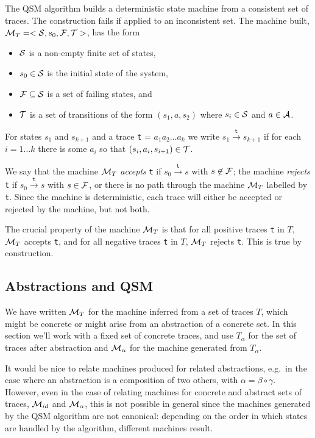 \documentclass[12pt]{article}
\begin{document}
The QSM algorithm builds a deterministic state machine from a consistent set of traces. The construction fails if applied to an inconsistent set. The  machine built, ${\cal{M}}_T = <{\cal{S}}, s_0, \cal{F}, \cal{T}>$, has the form 
\begin{itemize}
\item
$\cal{S}$ is a non-empty finite set of states,
\item
$s_0 \in \cal{S}$ is the initial state of the system,
\item
$\cal{F} \subseteq \cal{S}$ is a set of failing states, and 
\item
$\cal{T}$ is a set of transitions of the form $(s_1,a,s_2)$ where $s_i \in \cal{S}$ and $a \in \cal{A}$.
\end{itemize}
For states $s_1$ and $s_{k+1}$ and a trace \texttt{t} = $a_1{}a_2{}\ldots{}a_k$ we write $s_1 \stackrel{\texttt{t}}{\rightarrow} s_{k+1}$ if for each $i=1\ldots{}k$ there is some $a_i$ so that $(s_i,a_i,s_{i+1}) \in \cal{T}$. 

We say that the machine ${\cal{M}}_T$ \emph{accepts} \texttt{t} if $s_0 \stackrel{\texttt{t}}{\rightarrow} s$ with $s \not \in \cal{F}$; the machine \emph{rejects} \texttt{t} if $s_0 \stackrel{\texttt{t}}{\rightarrow} s$ with $s \in \cal{F}$, or there is no path through the machine ${\cal{M}}_T$ labelled by \texttt{t}. Since the machine is deterministic, each trace will either be accepted or rejected by the machine, but not both.


The crucial property of the machine ${\cal{M}}_T$ is that 
for all positive traces \texttt{t} in $T$, ${\cal{M}}_T$ accepts \texttt{t}, and
for all negative traces \texttt{t} in $T$, ${\cal{M}}_T$ rejects \texttt{t}. This is true by construction.


\subsection{Abstractions and QSM}

We have written ${\cal{M}}_T$ for the machine inferred from a set of traces $T$, which might be concrete or might arise from an abstraction of a concrete set. In this section we'll work with a fixed set of concrete traces, and use $T_\alpha$ for the set of traces after abstraction and ${\cal{M}}_\alpha$ for the machine generated from $T_\alpha$.

It would be nice to relate machines produced for related abstractions, e.g.\ in the case where an abstraction is a composition of two others, with $ \alpha = \beta \circ \gamma$. However, even in the case of relating machines for concrete and abstract sets of traces, ${\cal M}_{id}$ and ${\cal M}_\alpha$, this is not possible in general since the machines generated by the QSM algorithm are not canonical: depending on the order in which states are handled by the algorithm, different machines result.
\end{document}
